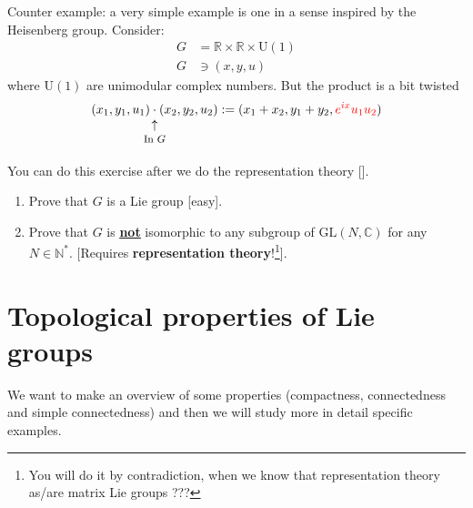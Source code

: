 \documentclass[../main.tex]{subfiles}
\begin{document}
Counter example: a very simple example is one in a sense inspired by the Heisenberg group. Consider:
\[
\begin{split}
G&=\mathbb{R}\times \mathbb{R}\times \textrm{U}(1)\\
G&\ni (x,y,u)
\end{split}
\]
where $\textrm{U}(1)$ are unimodular complex numbers. But the product is a bit twisted
\[
(x_1,y_1,u_1)\underset{\mathclap{\tikz \node {$\uparrow$} node [below=1ex] {\footnotesize In $G$ };}}{\cdot}(x_2,y_2,u_2) := (x_1+x_2, y_1+y_2, {\color{red}e^{ix}u_1u_2})
\]
\begin{starredExercise}
You can do this exercise after we do the representation theory [].
\begin{enumerate}
    \item Prove that $G$ is a Lie group [easy].
    \item Prove that $G$ is \underline{\underline{\textbf{not}}} isomorphic to any subgroup of $\textrm{GL}(N,\mathbb{C})$ for any $N\in\mathbb{N}^\ast$. [Requires \textbf{representation theory}!\footnote{You will do it by contradiction, when we know that representation theory as/are matrix Lie groups ???}].
\end{enumerate}
\end{starredExercise}
\section{Topological properties of Lie groups}
We want to make an overview of some properties (compactness, connectedness and simple connectedness) and then we will study more in detail specific examples.
\end{document}
